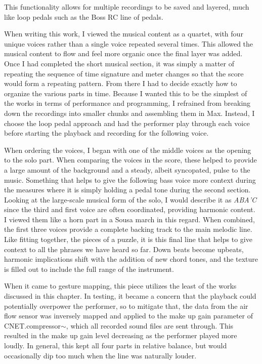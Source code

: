 This functionality allows for multiple recordings to be saved and layered, much like loop pedals such as the Boss RC line of pedals.

When writing this work, I viewed the musical content as a quartet, with four unique voices rather than a single voice repeated several times. This allowed the musical content to flow and feel more organic once the final layer was added. Once I had completed the short musical section, it was simply a matter of repeating the sequence of time signature and meter changes so that the score would form a repeating pattern. From there I had to decide exactly how to organize the various parts in time. Because I wanted this to be the simplest of the works in terms of performance and programming, I refrained from breaking down the recordings into smaller chunks and assembling them in Max. Instead, I choose the loop pedal approach and had the performer play through each voice before starting the playback and recording for the following voice. 

When ordering the voices, I began with one of the middle voices as the opening to the solo part. When comparing the voices in the score, these helped to provide a large amount of the background and a steady, albeit syncopated, pulse to the music. Something that helps to give the following bass voice more context during the measures where it is simply holding a pedal tone during the second section. Looking at the large-scale musical form of the solo, I would describe it as \emph{ABA'C} since the third and first voice are often coordinated, providing harmonic content. I viewed them like a horn part in a Sousa march in this regard. When combined, the first three voices provide a complete backing track to the main melodic line. Like fitting together, the pieces of a puzzle, it is this final line that helps to give context to all the phrases we have heard so far. Down beats become upbeats, harmonic implications shift with the addition of new chord tones, and the texture is filled out to include the full range of the instrument.

When it came to gesture mapping, this piece utilizes the least of the works discussed in this chapter. In testing, it became a concern that the playback could potentially overpower the performer, so to mitigate that, the data from the air flow sensor was inversely mapped and applied to the make up gain parameter of CNET.compressor$\sim$, which all recorded sound files are sent through. This resulted in the make up gain level decreasing as the performer played more loudly. In general, this kept all four parts in relative balance, but would occasionally dip too much when the line was naturally louder.

